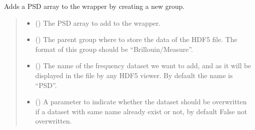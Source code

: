 \documentclass[letterpaper,10pt,english]{sphinxmanual}
\begin{document}
\begin{fulllineitems}

\begin{fulllineitems}
\label{\detokenize{_autosummary/HDF5_BLS.wrapper:HDF5_BLS.wrapper.Wrapper.add_PSD}}
\pysigstartsignatures
\pysiglinewithargsret
{}
{\sphinxparamcomma {}\sphinxparamcomma {}\sphinxparamcomma {}}
{}
\pysigstopsignatures
\sphinxAtStartPar
Adds a PSD array to the wrapper by creating a new group.
\begin{quote}\begin{description}
\begin{itemize}
\item {} 
\sphinxAtStartPar
{} () \textendash{} The PSD array to add to the wrapper.

\item {} 
\sphinxAtStartPar
{} (\sphinxstyleliteralemphasis{\sphinxupquote{, }}) \textendash{} The parent group where to store the data of the HDF5 file. The format of this group should be “Brillouin/Measure”.

\item {} 
\sphinxAtStartPar
{} (\sphinxstyleliteralemphasis{\sphinxupquote{, }}) \textendash{} The name of the frequency dataset we want to add, and as it will be displayed in the file by any HDF5 viewer. By default the name is “PSD”.

\item {} 
\sphinxAtStartPar
{} (\sphinxstyleliteralemphasis{\sphinxupquote{, }}) \textendash{} A parameter to indicate whether the dataset should be overwritten if a dataset with same name already exist or not, by default False \sphinxhyphen{} not overwritten.


\end{itemize}
\end{description}
\end{quote}
\end{fulllineitems}
\end{fulllineitems}
\end{document}
